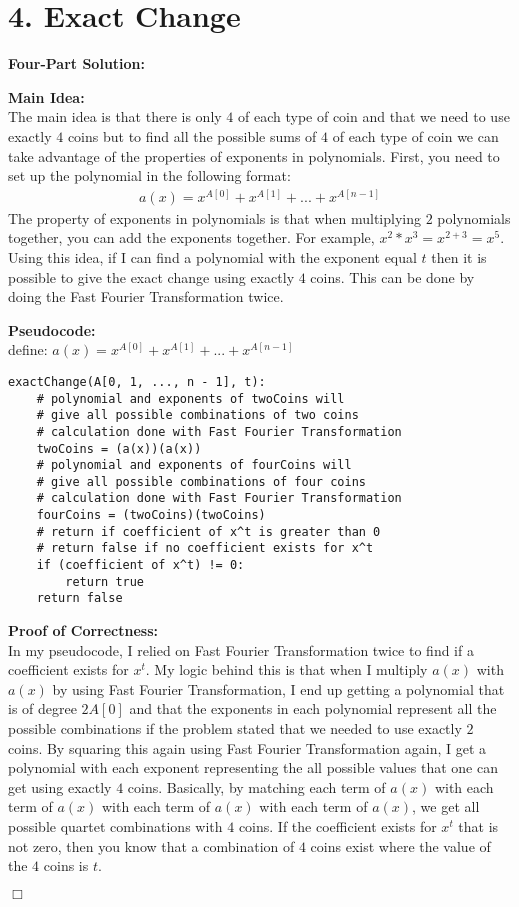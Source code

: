 \documentclass[11pt]{article}
\def\endproofmark{$\Box$}
\newenvironment{FourPartSolution}{\par{\bf Four-Part Solution:}}{\smallskip}
\newenvironment{mainIdea}{\par{\bf Main Idea:}}{\smallskip}
\newenvironment{pseudocode}{\par{\bf Pseudocode:}}{\smallskip}
\newenvironment{proofOfCorrectness}{\par{\bf Proof of Correctness:}}{\endproofmark\smallskip}
\begin{document}
\newpage
\section*{4. Exact Change}
\begin{FourPartSolution}
\begin{mainIdea}
\\
The main idea is that there is only $4$ of each type of coin and that we need to use exactly $4$ coins but to find all the possible sums of $4$ of each type of coin we can take advantage of the properties of exponents in polynomials. First, you need to set up the polynomial in the following format:
\begin{align*}
a(x) = x^{A[0]} + x^{A[1]} + ... + x^{A[n - 1]}
\end{align*}
The property of exponents in polynomials is that when multiplying $2$ polynomials together, you can add the exponents together. For example, $x^2 * x^3 = x^{2 + 3} = x^5$. Using this idea, if I can find a polynomial with the exponent equal $t$ then it is possible to give the exact change using exactly $4$ coins. This can be done by doing the Fast Fourier Transformation twice.
\end{mainIdea}
\\
\begin{pseudocode}
\\
define: $a(x) = x^{A[0]} + x^{A[1]} + ... + x^{A[n - 1]}$
\begin{lstlisting}
exactChange(A[0, 1, ..., n - 1], t):
	# polynomial and exponents of twoCoins will
	# give all possible combinations of two coins
	# calculation done with Fast Fourier Transformation
	twoCoins = (a(x))(a(x))
	# polynomial and exponents of fourCoins will
	# give all possible combinations of four coins
	# calculation done with Fast Fourier Transformation
	fourCoins = (twoCoins)(twoCoins)
	# return if coefficient of x^t is greater than 0
	# return false if no coefficient exists for x^t
	if (coefficient of x^t) != 0:
		return true
	return false
\end{lstlisting}
\end{pseudocode}
\begin{proofOfCorrectness}
\\
In my pseudocode, I relied on Fast Fourier Transformation twice to find if a coefficient exists for $x^t$. My logic behind this is that when I multiply $a(x)$ with $a(x)$ by using Fast Fourier Transformation, I end up getting a polynomial that is of degree $2A[0]$ and that the exponents in each polynomial represent all the possible combinations if the problem stated that we needed to use exactly $2$ coins. By squaring this again using Fast Fourier Transformation again, I get a polynomial with each exponent representing the all possible values that one can get using exactly $4$ coins. Basically, by matching each term of $a(x)$ with each term of $a(x)$ with each term of $a(x)$ with each term of $a(x)$, we get all possible quartet combinations with $4$ coins. If the coefficient exists for $x^t$ that is not zero, then you know that a combination of $4$ coins exist where the value of the $4$ coins is $t$.

\end{proofOfCorrectness}
\end{FourPartSolution}
\end{document}
